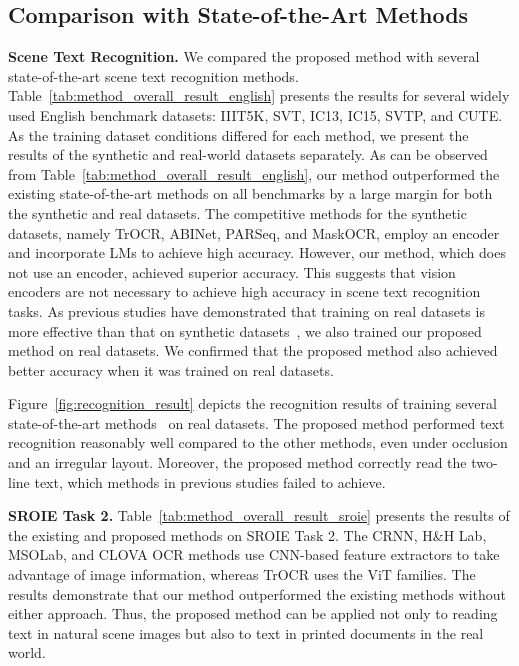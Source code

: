 \documentclass[10pt,twocolumn,letterpaper]{article}
\begin{document}
\subsection{Comparison with State-of-the-Art Methods}
\noindent
\textbf{Scene Text Recognition.}
We compared the proposed method with several state-of-the-art scene text recognition methods.
Table~\ref{tab:method_overall_result_english} presents the results for several widely used English benchmark datasets: IIIT5K, SVT, IC13, IC15, SVTP, and CUTE.
As the training dataset conditions differed for each method, we present the results of the synthetic and real-world datasets separately.
As can be observed from Table~\ref{tab:method_overall_result_english}, our method outperformed the existing state-of-the-art methods on all benchmarks by a large margin for both the synthetic and real datasets.
The competitive methods for the synthetic datasets, namely TrOCR, ABINet, PARSeq, and MaskOCR, employ an encoder and incorporate LMs to achieve high accuracy.
However, our method, which does not use an encoder, achieved superior accuracy.
This suggests that vision encoders are not necessary to achieve high accuracy in scene text recognition tasks.
As previous studies have demonstrated that training on real datasets is more effective than that on synthetic datasets~\cite{baek2021TRBA}, we also trained our proposed method on real datasets.
We confirmed that the proposed method also achieved better accuracy when it was trained on real datasets.

Figure~\ref{fig:recognition_result} depicts the recognition results of training several state-of-the-art methods~\cite{fang2021ABINet, bautista2022parseq} on real datasets.
The proposed method performed text recognition reasonably well compared to the other methods, even under occlusion and an irregular layout.
Moreover, the proposed method correctly read the two-line text, which methods in previous studies failed to achieve.

\noindent
\textbf{SROIE Task 2.}
Table~\ref{tab:method_overall_result_sroie} presents the results of the existing and proposed methods on SROIE Task 2.
The CRNN, H\&H Lab, MSOLab, and CLOVA OCR methods use CNN-based feature extractors to take advantage of image information, whereas
TrOCR uses the ViT families.
The results demonstrate that our method outperformed the existing methods without either approach.
Thus, the proposed method can be applied not only to reading text in natural scene images but also to text in printed documents in the real world.
\end{document}
